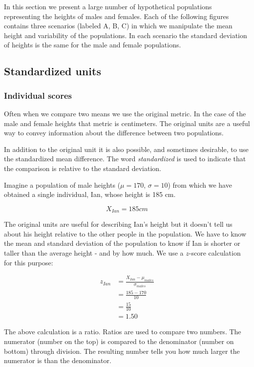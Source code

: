 \documentclass[
]{krantz}
\begin{document}
In this section we present a large number of hypothetical populations representing the heights of males and females. Each of the following figures contains three scenarios (labeled A, B, C) in which we manipulate the mean height and variability of the populations. In each scenario the standard deviation of heights is the same for the male and female populations.

\hypertarget{standardized-units}{%
\subsection{Standardized units}\label{standardized-units}}

\hypertarget{individual-scores}{%
\subsubsection{Individual scores}\label{individual-scores}}

Often when we compare two means we use the original metric. In the case of the male and female heights that metric is centimeters. The original units are a useful way to convey information about the difference between two populations.

In addition to the original unit it is also possible, and sometimes desirable, to use the standardized mean difference. The word \emph{standardized} is used to indicate that the comparison is relative to the standard deviation.

Imagine a population of male heights (\(\mu = 170\), \(\sigma = 10\)) from which we have obtained a single individual, Ian, whose height is 185 cm.

\[
X_{Ian} = 185cm
\]

The original units are useful for describing Ian's height but it doesn't tell us about his height relative to the other people in the population. We have to know the mean and standard deviation of the population to know if Ian is shorter or taller than the average height - and by how much. We use a \(z\)-score calculation for this purpose:

\[
\begin{aligned} 
z_{Ian} &=  \frac{X_{Ian} - \mu_{males}}{\sigma_{males}}\\ 
&=  \frac{185 - 170}{10}\\
&=  \frac{15}{10}\\
&= 1.50
\end{aligned} 
\]

The above calculation is a ratio. Ratios are used to compare two numbers. The numerator (number on the top) is compared to the denominator (number on bottom) through division. The resulting number tells you how much larger the numerator is than the denominator.
\end{document}
